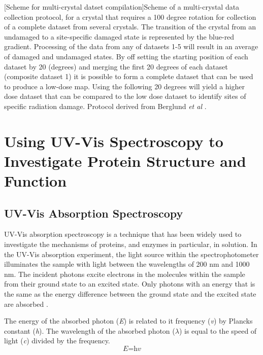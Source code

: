 \begin{minipage}{\linewidth}

	[Scheme for multi-crystal datset compilation]{Scheme of a multi-crystal data collection protocol, for a crystal that requires a 100 degree rotation for collection of a complete dataset from several crystals. The transition of the crystal from an undamaged to a site-specific damaged state is represented by the blue-red gradient. Processing of the data from any of datasets 1-5 will result in an average of damaged and undamaged states. By off setting the starting position of each dataset by 20 (degrees) and merging the first 20 degrees of each dataset (composite dataset 1) it is possible to form a complete dataset that can be used to produce a low-dose map. Using the following 20 degrees will yield a higher dose dataset that can be compared to the low dose dataset to identify sites of specific radiation damage. Protocol derived from Berglund \textit{et al} \cite{Berglund2002}. \label{fig:multi_offset}}	
\end{minipage} 


\cleardoublepage
\section{Using UV-Vis Spectroscopy to Investigate Protein Structure and Function}

\subsection{UV-Vis Absorption Spectroscopy}

UV-Vis absorption spectroscopy is a technique that has been widely used to investigate the mechanisms of proteins, and enzymes in particular, in solution. In the UV-Vis absorption experiment, the light source within the spectrophotometer illuminates the sample with light between the wavelengths of 200 nm and 1000 nm. The incident photons excite electrons in the molecules within the sample from their ground state to an excited state. Only photons with an energy that is the same as the energy difference between the ground state and the excited state are absorbed \cite{Saleh2001}. 

The energy of the absorbed photon (\textit{E}) is related to it frequency (\textit{v}) by Plancks constant (\textit{h}). The wavelength of the absorbed photon ($\lambda$) is equal to the speed of light (\textit{c}) divided by the frequency. 
\begin{equation}\label{eq:EnergytoFrequency}
\textit{E} = \textit{hv}
\end{equation}

